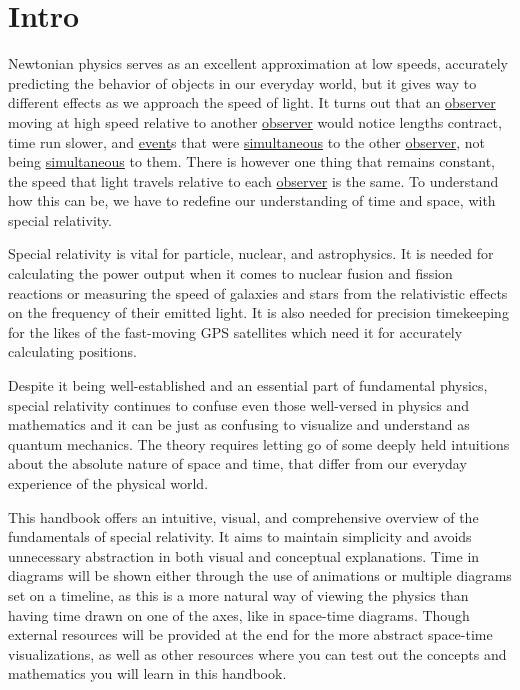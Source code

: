 \frontmatter
\chapter{Intro}

Newtonian physics serves as an excellent approximation at low speeds, accurately predicting the behavior of objects in our everyday world, but it gives way to different effects as we approach the speed of light. It turns out that an \hyperlink{def-observer}{observer} moving at high speed relative to another \hyperlink{def-observer}{observer} would notice lengths contract, time run slower, and \hyperlink{def-event}{event}s that were \hyperlink{def-simultaneity}{simultaneous} to the other \hyperlink{def-observer}{observer}, not being \hyperlink{def-simultaneity}{simultaneous} to them. There is however one thing that remains constant, the speed that light travels relative to each \hyperlink{def-observer}{observer} is the same. To understand how this can be, we have to redefine our understanding of time and space, with special relativity.

Special relativity is vital for particle, nuclear, and astrophysics. It is needed for calculating the power output when it comes to nuclear fusion and fission reactions or measuring the speed of galaxies and stars from the relativistic effects on the frequency of their emitted light. It is also needed for precision timekeeping for the likes of the fast-moving GPS satellites which need it for accurately calculating positions.

Despite it being well-established and an essential part of fundamental physics, special relativity continues to confuse even those well-versed in physics and mathematics and it can be just as confusing to visualize and understand as quantum mechanics. The theory requires letting go of some deeply held intuitions about the absolute nature of space and time, that differ from our everyday experience of the physical world.

This handbook offers an intuitive, visual, and comprehensive overview of the fundamentals of special relativity. It aims to maintain simplicity and avoids unnecessary abstraction in both visual and conceptual explanations. Time in diagrams will be shown either through the use of animations or multiple diagrams set on a timeline, as this is a more natural way of viewing the physics than having time drawn on one of the axes, like in space-time diagrams. Though external resources will be provided at the end for the more abstract space-time visualizations, as well as other resources where you can test out the concepts and mathematics you will learn in this handbook.

